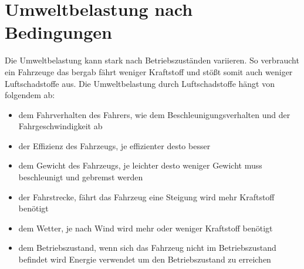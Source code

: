 
\section{Umweltbelastung nach Bedingungen}
Die Umweltbelastung kann stark nach Betriebszuständen variieren.
So verbraucht ein Fahrzeuge das bergab fährt weniger Kraftstoff und stößt somit auch weniger Luftschadstoffe aus.
Die Umweltbelastung durch Luftschadstoffe hängt von folgendem ab:
\begin{itemize}
	\item dem Fahrverhalten des Fahrers, wie dem Beschleunigungsverhalten und der Fahrgeschwindigkeit ab
	\item der Effizienz des Fahrzeugs, je effizienter desto besser
	\item dem Gewicht des Fahrzeugs, je leichter desto weniger Gewicht muss beschleunigt und gebremst werden
	\item der Fahrstrecke, fährt das Fahrzeug eine Steigung wird mehr Kraftstoff benötigt
	\item dem Wetter, je nach Wind wird mehr oder weniger Kraftstoff benötigt
	\item dem Betriebszustand, wenn sich das Fahrzeug nicht im Betriebszustand befindet wird Energie verwendet um den Betriebszustand zu erreichen
\end{itemize}

